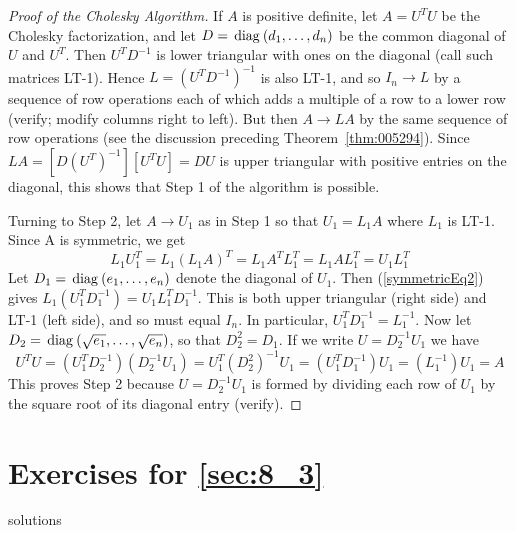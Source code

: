 \begin{proof}[Proof of the Cholesky Algorithm]
If $A$ is positive definite, let $A = U^{T}U$ be the Cholesky factorization, and let $D = \thinspace\operatorname{diag\medspace}(d_{1}, \dots, d_{n})$ be the common diagonal of $U$ and $U^{T}$. Then $U^{T}D^{-1}$ is lower triangular with ones on the diagonal (call such matrices LT-1). Hence $L = (U^{T}D^{-1})^{-1}$ is also LT-1, and so $I_{n} \to L$ by a sequence of row operations each of which adds a multiple of a row 
to a lower row (verify; modify columns right to left). But then $A \to LA$ by the same sequence of row operations (see the discussion preceding Theorem~\ref{thm:005294}). Since $LA = [D(U^{T})^{-1}][U^{T}U] = DU$ is upper triangular with positive entries on the diagonal, this shows that Step 1 of the algorithm is possible.

Turning to Step 2, let $A \to U_{1}$ as in Step 1 so that $U_{1} = L_{1}A$ where $L_{1}$ is
LT-1. Since A is symmetric, we get
\begin{equation} \label{symmetricEq2}
L_{1}U_{1}^T = L_{1}(L_{1}A)^T = L_{1}A^TL_{1}^T = L_{1}AL_{1}^T = U_{1}L_{1}^T
\end{equation}
Let $D_{1} = \thinspace\operatorname{diag\medspace}(e_{1}, \dots, e_{n})$ denote the diagonal of $U_{1}$. Then (\ref{symmetricEq2}) gives $L_{1}(U_{1}^TD_{1}^{-1}) = U_{1}L_{1}^TD_{1}^{-1}$. This is both upper triangular (right side) and LT-1 (left side), and so must equal $I_{n}$. In particular, $U_{1}^TD_{1}^{-1} = L_{1}^{-1}$. Now let $D_{2} = \thinspace\operatorname{diag\medspace}(\sqrt{e_{1}}, \dots, \sqrt{e_{n}})$, so that $D_{2}^2 = D_{1}$. If we write $U = D_{2}^{-1}U_{1}$
 we have
\begin{equation*}
U^TU = (U_{1}^TD_{2}^{-1})(D_{2}^{-1}U_{1}) = U_{1}^T(D_{2}^2)^{-1}U_{1} = (U_{1}^TD_{1}^{-1})U_{1} = (L_{1}^{-1})U_{1} = A
\end{equation*}
This proves Step 2 because $U = D_{2}^{-1}U_{1}$ is formed by dividing each row of $U_{1}$ by the square root of its diagonal entry (verify).
\end{proof}

\section*{Exercises for \ref{sec:8_3}}

\begin{Filesave}{solutions}
\end{Filesave}

